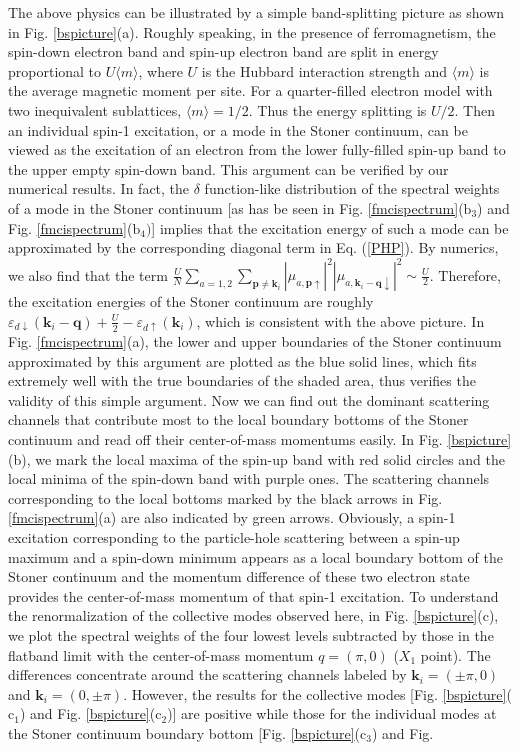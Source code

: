 \documentclass[amsmath,superscriptaddress,showpacs,aps,prb,twocolumn]{revtex4-1}
\begin{document}
\par The above physics can be illustrated by a simple band-splitting picture as shown in Fig. \ref{bspicture}(a). Roughly speaking, in the presence of ferromagnetism, the spin-down electron band and spin-up electron band are split in energy proportional to $U\langle m \rangle$, where $U$ is the Hubbard interaction strength and $\langle m \rangle$ is the average magnetic moment per site. For a quarter-filled electron model with two inequivalent sublattices, $\langle m \rangle=1/2$. Thus the energy splitting is $U/2$. Then an individual spin-1 excitation, or a mode in the Stoner continuum, can be viewed as the excitation of an electron from the lower fully-filled spin-up band to the upper empty spin-down band. This argument can be verified by our numerical results. In fact, the $\delta$ function-like distribution of the spectral weights of a mode in the Stoner continuum [as has be seen in Fig. \ref{fmcispectrum}($\text{b}_3$) and Fig. \ref{fmcispectrum}($\text{b}_4)$] implies that the excitation energy of such a mode can be approximated by the corresponding diagonal term in Eq. (\ref{PHP}). By numerics, we also find that the term $\frac{U}{N} \sum_{a=1,2} \sum_{\mathbf{p}\neq\mathbf{k}_i} \left| \mu_{a,\mathbf{p}\uparrow} \right|^2 \left| \mu_{a,\mathbf{k}_{i}-\mathbf{q}\downarrow} \right|^2 \sim \frac{U}{2}$. Therefore, the excitation energies of the Stoner continuum are roughly $\varepsilon_{d\downarrow} (\mathbf{k}_i-\mathbf{q}) + \frac{U}{2} -\varepsilon_{d\uparrow} (\mathbf{k}_i)$, which is consistent with the above picture. In Fig. \ref{fmcispectrum}(a), the lower and upper boundaries of the Stoner continuum approximated by this argument are plotted as the blue solid lines, which fits extremely well with the true boundaries of the shaded area, thus verifies the validity of this simple argument. Now we can find out the dominant scattering channels that contribute most to the local boundary bottoms of the Stoner continuum and read off their center-of-mass momentums easily. In Fig. \ref{bspicture}(b), we mark the local maxima of the spin-up band with red solid circles and the local minima of the spin-down band with purple ones. The scattering channels corresponding to the local bottoms marked by the black arrows in Fig. \ref{fmcispectrum}(a) are also indicated by green arrows. Obviously, a spin-1 excitation corresponding to the particle-hole scattering between a spin-up maximum and a spin-down minimum appears as a local boundary bottom of the Stoner continuum and the momentum difference of these two electron state provides the center-of-mass momentum of that spin-1 excitation. To understand the renormalization of the collective modes observed here, in Fig. \ref{bspicture}(c), we plot the spectral weights of the four lowest levels subtracted by those in the flatband limit with the center-of-mass momentum $q=(\pi,0)$ ($X_1$ point). The differences concentrate around the scattering channels labeled by $\mathbf{k}_i=(\pm\pi,0)$ and $\mathbf{k}_i=(0,\pm\pi)$. However, the results for the collective modes [Fig. \ref{bspicture}($\text{c}_1$) and Fig. \ref{bspicture}($\text{c}_2$)] are positive while those for the individual modes at the Stoner continuum boundary bottom [Fig. \ref{bspicture}($\text{c}_3$) and Fig. 
\end{document}
